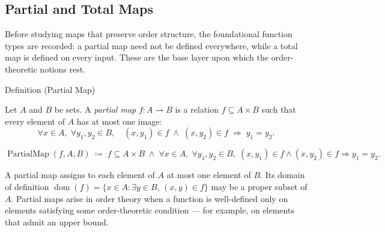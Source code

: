 
\subsection{Partial and Total Maps}
\label{sec:partial-total-maps}

\begin{remark*}
Before studying maps that preserve order structure, the foundational
function types are recorded: a partial map need not be defined everywhere,
while a total map is defined on every input.  These are the base layer
upon which the order-theoretic notions rest.
\end{remark*}


\begin{definitionbox}{Definition (Partial Map)}
\begin{definition}
\label{def:partial-map}
Let $A$ and $B$ be sets.  A \emph{partial map} $f : A \rightharpoonup B$
is a relation $f \subseteq A \times B$ such that every element of $A$ has
at most one image:
\[
\forall x \in A,\; \forall y_1, y_2 \in B,\quad
(x, y_1) \in f \;\land\; (x, y_2) \in f
\;\Longrightarrow\; y_1 = y_2.
\]
\end{definition}
\end{definitionbox}

\begin{remark*}
\[
\operatorname{PartialMap}(f, A, B)
\;\coloneqq\;
f \subseteq A \times B
\;\land\;
\forall x \in A,\; \forall y_1, y_2 \in B,\;
(x,y_1) \in f \land (x,y_2) \in f \Rightarrow y_1 = y_2.
\]
\end{remark*}

\begin{remark*}[Interpretation]
A partial map assigns to each element of $A$ at most one element of $B$.
Its domain of definition
$\operatorname{dom}(f) = \{x \in A : \exists y \in B,\, (x,y) \in f\}$
may be a proper subset of $A$.  Partial maps arise in order theory when
a function is well-defined only on elements satisfying some order-theoretic
condition --- for example, on elements that admit an upper bound.
\end{remark*}

